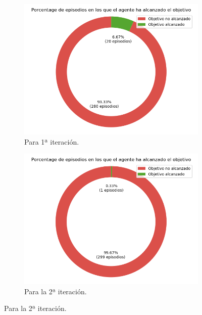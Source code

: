 \begin{figure}
    \centering
    \begin{subfigure}{.5\textwidth}
        \centering
        \includegraphics[scale=0.3]{cap5_experimentacion/images/CHANGE_GOAL-20_09-22_01-2, 0, 1_it1_porcentajeResuelto.png}
        \caption{Para 1ª iteración.}
        \label{fig:CHANGE_GOAL-20_09-22_01-2, 0, 1_it1_porcentajeResuelto}
    \end{subfigure}%
    \begin{subfigure}{.5\textwidth}
        \centering
        \includegraphics[scale=0.3]{cap5_experimentacion/images/CHANGE_GOAL-20_09-22_01-2, 0, 1_it2_porcentajeResuelto.png}
        \caption{Para la 2ª iteración.}
        \label{fig:CHANGE_GOAL-20_09-22_01-2, 0, 1_it3_porcentajeResuelto}

\end{subfigure}
\end{figure}
